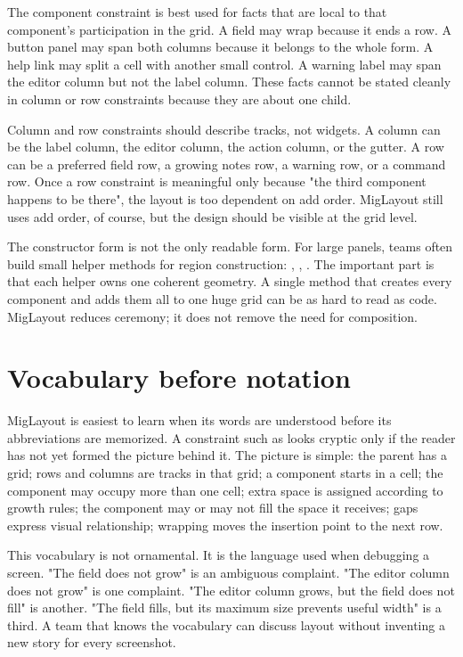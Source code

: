 The component constraint is best used for facts that are local to that
component's participation in the grid. A field may wrap because it ends a row. A
button panel may span both columns because it belongs to the whole form. A help
link may split a cell with another small control. A warning label may span the
editor column but not the label column. These facts cannot be stated cleanly in
column or row constraints because they are about one child.

Column and row constraints should describe tracks, not widgets. A column can be
the label column, the editor column, the action column, or the gutter. A row can
be a preferred field row, a growing notes row, a warning row, or a command row.
Once a row constraint is meaningful only because "the third component happens to
be there", the layout is too dependent on add order. MigLayout still uses add
order, of course, but the design should be visible at the grid level.

The constructor form is not the only readable form. For large panels, teams
often build small helper methods for region construction: ,
, . The important part is that each
helper owns one coherent geometry. A single method that creates every component
and adds them all to one huge grid can be as hard to read as 
code. MigLayout reduces ceremony; it does not remove the need for composition.

\section{Vocabulary before notation}

MigLayout is easiest to learn when its words are understood before its
abbreviations are memorized. A constraint such as 
looks cryptic only if the reader has not yet formed the picture behind it. The
picture is simple: the parent has a grid; rows and columns are tracks in that
grid; a component starts in a cell; the component may occupy more than one
cell; extra space is assigned according to growth rules; the component may or
may not fill the space it receives; gaps express visual relationship; wrapping
moves the insertion point to the next row.

This vocabulary is not ornamental. It is the language used when debugging a
screen. "The field does not grow" is an ambiguous complaint. "The editor column
does not grow" is one complaint. "The editor column grows, but the field does
not fill" is another. "The field fills, but its maximum size prevents useful
width" is a third. A team that knows the vocabulary can discuss layout without
inventing a new story for every screenshot.


